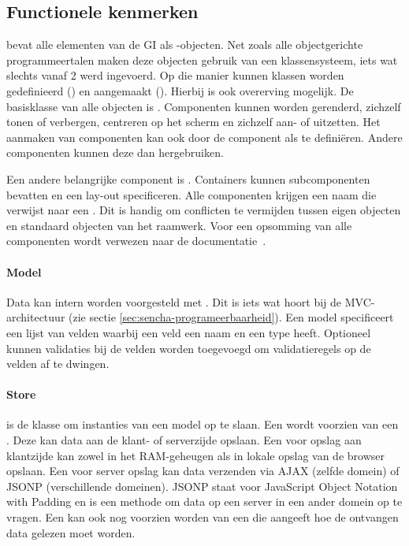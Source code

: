 \subsection{Functionele kenmerken}
\st{} bevat alle elementen van de GI als \js{}-objecten.  
Net zoals alle objectgerichte programmeertalen maken deze objecten gebruik van een klassensysteem,  iets wat slechts vanaf \st{} 2 werd ingevoerd.  
Op die manier kunnen klassen worden gedefinieerd () en aangemaakt ().  
Hierbij is ook overerving mogelijk.  
De basisklasse van alle objecten is .  
Componenten kunnen worden gerenderd, zichzelf tonen of verbergen,  centreren op het scherm en zichzelf aan- of uitzetten.   
Het aanmaken van componenten kan ook door de component als  te definiëren.  
Andere componenten kunnen deze  dan hergebruiken.

Een andere belangrijke component is .  
Containers kunnen subcomponenten bevatten en een lay-out specificeren.  
Alle componenten krijgen een naam die verwijst naar een .  
Dit is handig om conflicten te vermijden tussen eigen objecten en standaard objecten van het raamwerk.  
Voor een opsomming van alle componenten wordt verwezen naar de documentatie~\cite{Inc.2013a}.

\paragraph{Model}
Data kan intern worden voorgesteld met .  
Dit is iets wat hoort bij de MVC-architectuur (zie sectie \ref{sec:sencha-programeerbaarheid}).  
Een model specificeert een lijst van velden waarbij een veld een naam en een type heeft.  
Optioneel kunnen validaties bij de velden worden toegevoegd om validatieregels op de velden af te dwingen.  

\paragraph{Store}
 is de klasse om instanties van een model op te slaan.  
Een  wordt voorzien van een .  
Deze kan data aan de klant- of serverzijde opslaan.  
Een  voor opslag aan klantzijde kan zowel in het RAM-geheugen als in lokale opslag van de browser opslaan.  
Een  voor server opslag kan data verzenden via AJAX (zelfde domein) of JSONP (verschillende domeinen).  
JSONP staat voor JavaScript Object Notation with Padding en is een methode om data op een server in een ander domein op te vragen.
Een  kan ook nog voorzien worden van een  die aangeeft hoe de ontvangen data gelezen moet worden.

